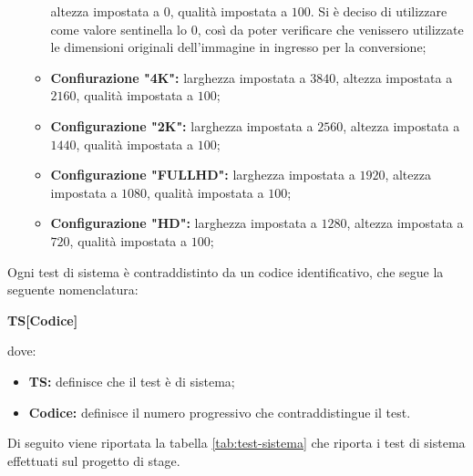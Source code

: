 \begin{itemize}
\begin{itemize}
                    altezza impostata a $0$, qualità impostata a $100$. Si è deciso di
                    utilizzare come valore sentinella lo 0, così da poter verificare che
                    venissero utilizzate le dimensioni originali dell'immagine in ingresso
                    per la conversione;
              \item \textbf{Confiurazione "4K":} larghezza impostata a $3840$, altezza
                    impostata a $2160$, qualità impostata a $100$;
              \item \textbf{Configurazione "2K":} larghezza impostata a $2560$, altezza
                    impostata a $1440$, qualità impostata a $100$;
              \item \textbf{Configurazione "FULLHD":} larghezza impostata a $1920$,
                    altezza impostata a $1080$, qualità impostata a $100$;
              \item \textbf{Configurazione "HD":} larghezza impostata a $1280$, altezza
                    impostata a $720$, qualità impostata a $100$;
          \end{itemize}
\end{itemize}

Ogni test di sistema è contraddistinto da un codice identificativo, che segue la
seguente nomenclatura: \\
\begin{center}
    \textbf{TS[Codice]}
\end{center}
dove:
\begin{itemize}
    \item \textbf{TS:} definisce che il test è di sistema;
    \item \textbf{Codice:} definisce il numero progressivo che contraddistingue il test.
\end{itemize}

Di seguito viene riportata la tabella \ref{tab:test-sistema} che riporta i test
di sistema effettuati sul progetto di stage.

